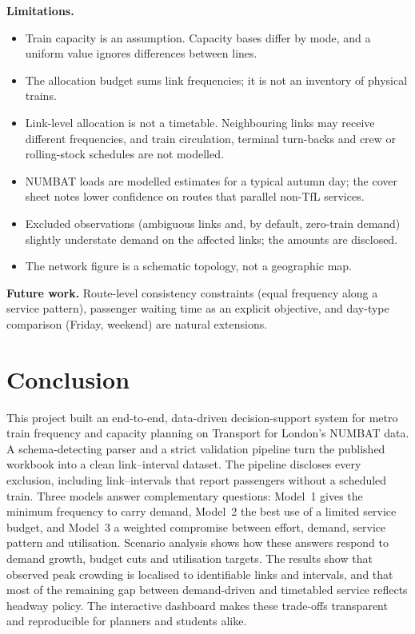 \documentclass[conference]{IEEEtran}
\begin{document}
\textbf{Limitations.}
\begin{itemize}
\item Train capacity is an assumption. Capacity bases differ by mode, and a uniform value ignores differences between
  lines.
\item The allocation budget sums link frequencies; it is not an inventory of physical trains.
\item Link-level allocation is not a timetable. Neighbouring links may receive different frequencies, and train
  circulation, terminal turn-backs and crew or rolling-stock schedules are not modelled.
\item NUMBAT loads are modelled estimates for a typical autumn day; the cover sheet notes lower confidence on routes
  that parallel non-TfL services.
\item Excluded observations (ambiguous links and, by default, zero-train demand) slightly understate demand on the
  affected links; the amounts are disclosed.
\item The network figure is a schematic topology, not a geographic map.
\end{itemize}

\textbf{Future work.} Route-level consistency constraints (equal frequency along a service pattern), passenger waiting
time as an explicit objective, and day-type comparison (Friday, weekend) are natural extensions.

\section{Conclusion}\label{sec:conclusion}
This project built an end-to-end, data-driven decision-support system for metro train frequency and capacity planning
on Transport for London's NUMBAT data. A schema-detecting parser and a strict validation pipeline turn the published
workbook into a clean link--interval dataset. The pipeline discloses every exclusion, including link--intervals that report
passengers without a scheduled train. Three models answer complementary questions: Model~1 gives the minimum
frequency to carry demand, Model~2 the best use of a limited service budget, and Model~3 a weighted compromise between
effort, demand, service pattern and utilisation. Scenario analysis shows how these answers respond to demand growth,
budget cuts and utilisation targets. The results show that observed peak crowding is localised to identifiable links
and intervals, and that most of the remaining gap between demand-driven and timetabled service reflects headway
policy. The interactive dashboard makes these trade-offs transparent and reproducible for planners and students alike.
\end{document}
